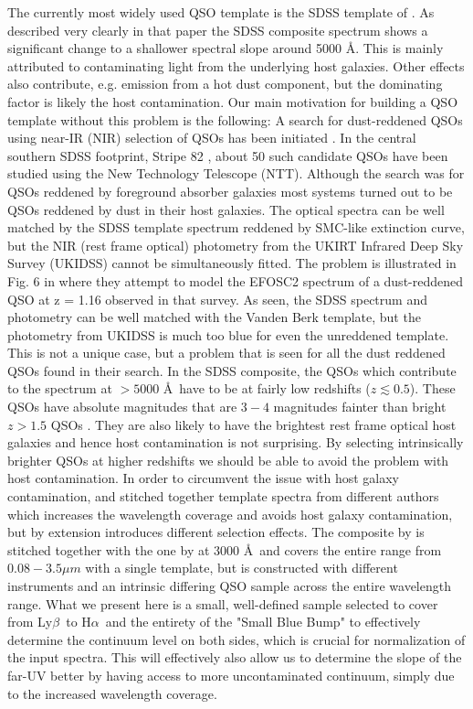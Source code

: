 \documentclass{aa}    %
\newcommand{\lyb}{Ly$\beta$}
\newcommand{\ha}{H$\alpha$}
\begin{document}
The currently most widely used QSO template is the SDSS template of
\citet{VandenBerk2001}. As described very clearly in that paper the
SDSS composite spectrum shows a significant change to a shallower
spectral slope around 5000 \AA. This is mainly attributed to
contaminating light from the underlying host galaxies. Other effects
also contribute, e.g. emission from a hot dust component, but the
dominating factor is likely the host contamination. Our main
motivation for building a QSO template without this problem is the
following: A search for dust-reddened QSOs using
near-IR (NIR) selection of QSOs has been initiated \citep{Fynbo2013, Krogager2015}. 
In the central southern SDSS footprint, Stripe 82 \citep{Annis2014}, about 50 such candidate QSOs have been studied using the
New Technology Telescope (NTT). Although the search was for QSOs reddened by foreground absorber
galaxies most systems turned out to be QSOs reddened by dust in their
host galaxies. The optical spectra can be well matched by the SDSS
template spectrum reddened by SMC-like extinction curve, but the NIR
(rest frame optical) photometry from the UKIRT Infrared Deep Sky Survey (UKIDSS) cannot be simultaneously
fitted. The problem is illustrated in Fig. 6 in \citet{Fynbo2013}
where they attempt to model the EFOSC2 spectrum of a dust-reddened QSO
at z = 1.16 observed in that survey. As seen, the SDSS spectrum and
photometry can be well matched with the Vanden Berk template, but the
photometry from UKIDSS is much too blue for even the unreddened
template. This is not a unique case, but a problem that is seen for
all the dust reddened QSOs found in their search.  In the SDSS
composite, the QSOs which contribute to the spectrum at $ > 5000$
\AA~have to be at fairly low redshifts ($z \lesssim 0.5$). These QSOs
have absolute magnitudes that are $3-4$ magnitudes fainter than bright
$z > 1.5$ QSOs \citep[e.g.,][their Fig.~1]{VandenBerk2001}. They are
also likely to have the brightest rest frame optical host galaxies and
hence host contamination is not surprising. By selecting intrinsically
brighter QSOs at higher redshifts we should be able to avoid the
problem with host contamination.  In order to circumvent the issue
with host galaxy contamination, \citet{Fynbo2013} and
\citet{Krogager2015} stitched together template spectra from different
authors which increases the wavelength coverage and avoids host galaxy
contamination, but by extension introduces different selection
effects. The composite by \citet{Glikman2006} is stitched together
with the one by \citet{VandenBerk2001} at $3000$ \AA~and covers the
entire range from $0.08 - 3.5 \mu m$ with a single template, but is
constructed with different instruments and an intrinsic differing QSO
sample across the entire wavelength range.  What we present here is a
small, well-defined sample selected to cover from \lyb~to \ha~and the
entirety of the "Small Blue Bump" to effectively determine the
continuum level on both sides, which is crucial for normalization of
the input spectra. This will effectively also allow us to determine
the slope of the far-UV better by having access to more uncontaminated
continuum, simply due to the increased wavelength coverage.
\end{document}
